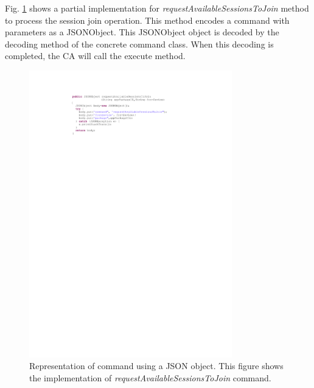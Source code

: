 \documentclass[conference]{IEEEtran}
\begin{document}
Fig. \ref{fig:commands} shows a partial implementation for \textit{requestAvailableSessionsToJoin} method to process the session join operation. This method encodes a command with parameters as a {\small \sffamily JSONObject}.  This {\small \sffamily JSONObject} object is decoded by the {\small \sffamily decoding}  method  of the concrete command class. When this decoding is completed, the CA will call the {\small \sffamily execute}  method.
\begin{figure}[htb] 
\centering
\includegraphics[width=8.8cm,keepaspectratio]{commands}
\caption{Representation of command using a JSON object. 
This figure shows the implementation of  \textit{requestAvailableSessionsToJoin} command.
}
\label{fig:commands}
\end{figure}
 
\end{document}
